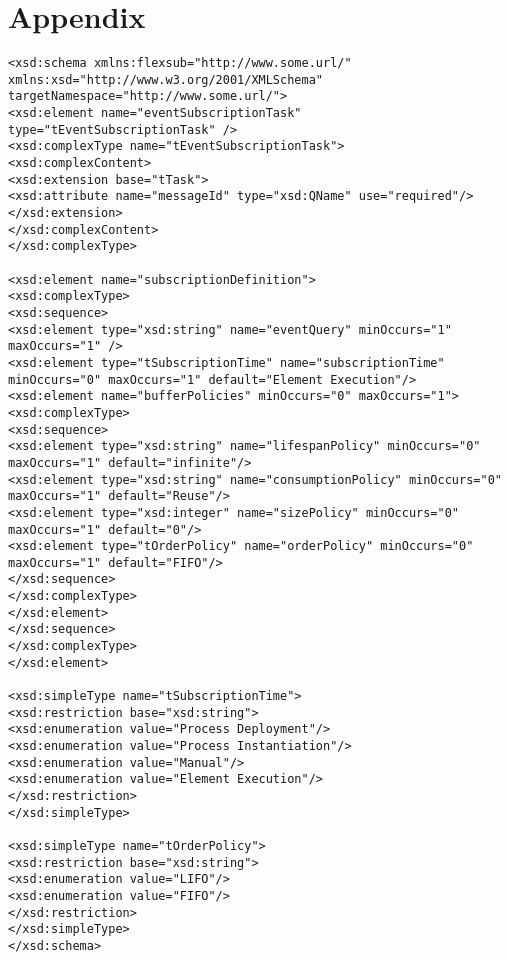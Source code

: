 \chapter{Appendix}

\begin{lstlisting}[basicstyle=\scriptsize,caption={XSD schema of the BPMN extension for flexible event subscription},label=lst:xsd-flexsub]
<xsd:schema xmlns:flexsub="http://www.some.url/" xmlns:xsd="http://www.w3.org/2001/XMLSchema" targetNamespace="http://www.some.url/">
<xsd:element name="eventSubscriptionTask" type="tEventSubscriptionTask" />
<xsd:complexType name="tEventSubscriptionTask">
<xsd:complexContent>
<xsd:extension base="tTask">
<xsd:attribute name="messageId" type="xsd:QName" use="required"/>
</xsd:extension>
</xsd:complexContent>
</xsd:complexType>

<xsd:element name="subscriptionDefinition">
<xsd:complexType>
<xsd:sequence>
<xsd:element type="xsd:string" name="eventQuery" minOccurs="1" maxOccurs="1" />
<xsd:element type="tSubscriptionTime" name="subscriptionTime" minOccurs="0" maxOccurs="1" default="Element Execution"/>
<xsd:element name="bufferPolicies" minOccurs="0" maxOccurs="1">
<xsd:complexType>
<xsd:sequence>
<xsd:element type="xsd:string" name="lifespanPolicy" minOccurs="0" maxOccurs="1" default="infinite"/>
<xsd:element type="xsd:string" name="consumptionPolicy" minOccurs="0" maxOccurs="1" default="Reuse"/>
<xsd:element type="xsd:integer" name="sizePolicy" minOccurs="0" maxOccurs="1" default="0"/>
<xsd:element type="tOrderPolicy" name="orderPolicy" minOccurs="0" maxOccurs="1" default="FIFO"/>
</xsd:sequence>
</xsd:complexType>
</xsd:element>
</xsd:sequence>
</xsd:complexType>
</xsd:element>

<xsd:simpleType name="tSubscriptionTime">
<xsd:restriction base="xsd:string">
<xsd:enumeration value="Process Deployment"/>
<xsd:enumeration value="Process Instantiation"/>
<xsd:enumeration value="Manual"/>
<xsd:enumeration value="Element Execution"/>
</xsd:restriction>
</xsd:simpleType>

<xsd:simpleType name="tOrderPolicy">
<xsd:restriction base="xsd:string">
<xsd:enumeration value="LIFO"/>
<xsd:enumeration value="FIFO"/>
</xsd:restriction>
</xsd:simpleType>
</xsd:schema>
\end{lstlisting}



